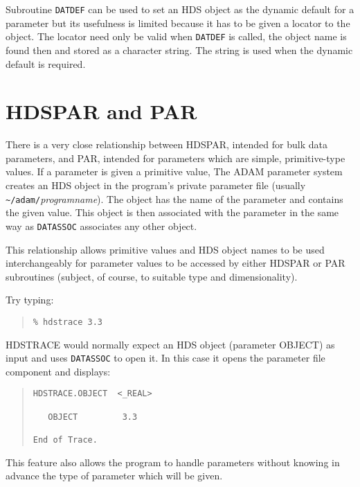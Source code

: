 \documentclass[twoside,11pt]{article}
\newcommand{\htmlref}[2]{#1}
\newcommand{\xref}[3]{#1}
\newcommand{\xlabel}[1]{}
\renewcommand{\_}{\texttt{\symbol{95}}}
\begin{document}
Subroutine
\htmlref{\texttt{DAT\_DEF}}{DAT_DEF}
can be used to set an HDS object as the dynamic default for a parameter but its
usefulness is limited because it has to be given a locator to the object.
The locator need only be valid when \texttt{DAT\_DEF} is called, the object 
name is found then and stored as a character string. 
The string is used when the dynamic default is required.

\section{\xlabel{hdspar_and_par}HDSPAR and PAR}
There is a very close relationship between
HDSPAR, intended for bulk data parameters, and
\xref{PAR}{sun114}{abstract},
intended for parameters which are simple, 
\xref{primitive-type}{sun92}{HDS_objects}
values.
If a parameter is given a primitive value, The ADAM parameter system creates
an HDS object in the program's private parameter file (usually
\verb!~/adam/!\textit{program\_name}).
The object has the name of the parameter and contains the given value.
This object is then associated with the parameter in the same way as 
\htmlref{\texttt{DAT\_ASSOC}}{DAT_ASSOC}
associates any other object.

This relationship allows primitive values and HDS object names to be used
interchangeably for parameter values to be accessed by either HDSPAR or PAR 
subroutines (subject, of course, to suitable type and dimensionality).

Try typing:
\begin{quote} \begin{verbatim}
% hdstrace 3.3
\end{verbatim} \end{quote}

\xref{HDSTRACE}{sun102}{abstract}
would normally expect an HDS object (parameter OBJECT) as input and uses 
\texttt{DAT\_ASSOC} to open it. 
In this case it opens the parameter file component and displays:
\begin{quote} \begin{verbatim}
HDSTRACE.OBJECT  <_REAL>

   OBJECT         3.3

End of Trace.
\end{verbatim} \end{quote}

This feature also allows the program to handle parameters without knowing in 
advance the type of parameter which will be given.
\end{document}

